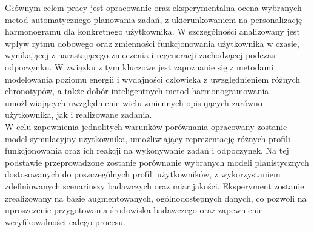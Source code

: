 \quad Głównym celem pracy jest opracowanie oraz eksperymentalna ocena wybranych metod automatycznego planowania zadań, z ukierunkowaniem na personalizację harmonogramu dla konkretnego użytkownika. W szczególności analizowany jest wpływ rytmu dobowego oraz zmienności funkcjonowania użytkownika w czasie, wynikającej z narastającego zmęczenia i regeneracji zachodzącej podczas odpoczynku. W związku z tym kluczowe jest zapoznanie się z metodami modelowania poziomu energii i wydajności człowieka z uwzględnieniem różnych chronotypów, a także dobór inteligentnych metod harmonogramowania umożliwiających uwzględnienie wielu zmiennych opisujących zarówno użytkownika, jak i realizowane zadania.
\\\indent W celu zapewnienia jednolitych warunków porównania opracowany zostanie model symulacyjny użytkownika, umożliwiający reprezentację różnych profili funkcjonowania oraz ich reakcji na wykonywanie zadań i odpoczynek. Na tej podstawie przeprowadzone zostanie porównanie wybranych modeli planistycznych dostosowanych do poszczególnych profili użytkowników, z wykorzystaniem zdefiniowanych scenariuszy badawczych oraz miar jakości. Eksperyment zostanie zrealizowany na bazie augmentowanych, ogólnodostępnych danych, co pozwoli na uproszczenie przygotowania środowiska badawczego oraz zapewnienie weryfikowalności całego procesu.
